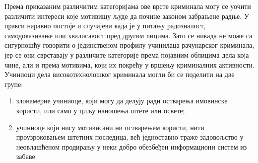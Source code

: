 \documentclass[a4paper]{article}
\begin{document}
	Према приказаним различитим категоријама ове врсте криминала могу се уочити различити интереси које мотивишу људе да почине законом забрањене радње. У пракси наравно постоје и случајеви када је у питању радозналост, самодоказивање или хвалисавост пред другим лицима. Зато се никада не може са сигурношћу говорити о јединственом профилу учинилаца рачунарског криминала, јер се они сврставају у различите категорије према појавним облицима дела која чине, али и према мотивима, који их покрећу у вршењу криминалних активности. \newline
	Учиниоци дела високотехнолошког криминала могли би се поделити на две групе:
	\begin{enumerate}
		\item злонамерне учиниоце, који могу да делују ради остварења имовинске користи, или само у циљу наношења штете или освете;
		\item учиниоце који нису мотивисани ни остварењем користи, нити проузроковањем штетних последица, већ једноставно траже задовољство у неовлашћеном продирању у неки добро обезбеђен информациони систем из забаве.
	\end{enumerate}
\end{document}
